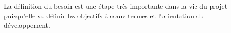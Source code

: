 \label{sec:3.1-besoin}

La définition du besoin est une étape très importante dans la vie du projet puisqu'elle va définir les objectifs à cours termes et l'orientation du développement. 